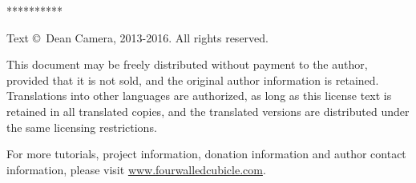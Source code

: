 \vspace*{\fill}
\centerline{**********}

Text \copyright \ Dean Camera, 2013-2016. All rights reserved.

This document may be freely distributed without payment to the author, provided that it is not sold, and the original author information is retained. Translations into other languages are authorized, as long as this license text is retained in all translated copies, and the translated versions are distributed under the same licensing restrictions.

For more tutorials, project information, donation information and author contact information, please visit \href{http://www.fourwalledcubicle.com}{www.fourwalledcubicle.com}.

\cleardoublepage
